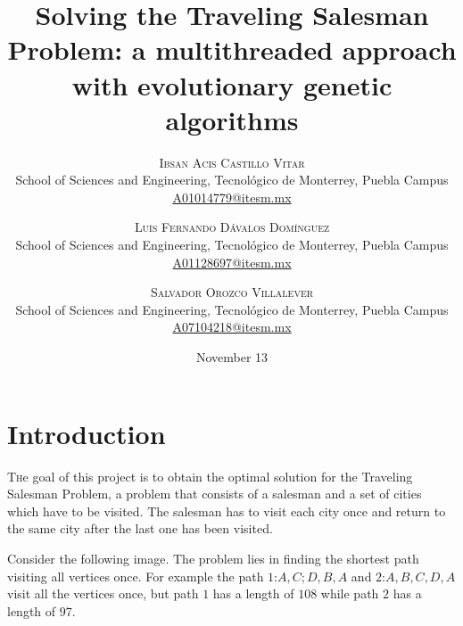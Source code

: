 \documentclass[twoside,twocolumn]{article}
\title{Solving the Traveling Salesman Problem: a multithreaded approach with evolutionary genetic algorithms} %
\author{%
  \textsc{Ibsan Acis Castillo Vitar} \\[1ex] %
  \normalsize School of Sciences and Engineering, Tecnológico de Monterrey, Puebla Campus \\ %
  \normalsize \href{mailto:A01014779@itesm.mx}{A01014779@itesm.mx} %
  \and %
  \textsc{Luis Fernando Dávalos Domínguez} \\[1ex] %
  \normalsize School of Sciences and Engineering, Tecnológico de Monterrey, Puebla Campus \\ %
  \normalsize \href{mailto:A01128697@itesm.mx}{A01128697@itesm.mx} %
  \and %
  \textsc{Salvador Orozco Villalever} \\[1ex] %
  \normalsize School of Sciences and Engineering, Tecnológico de Monterrey, Puebla Campus \\ %
  \normalsize \href{mailto:A07104218@itesm.mx}{A07104218@itesm.mx} %
  }
\date{November 13\nth 2017} %
\begin{document}
  
  \maketitle
  
  
  \section{Introduction}
  
  \lettrine[nindent=0em,lines=3]{T}he goal of this project is to obtain the optimal solution for the Traveling Salesman Problem, a problem that consists of a salesman and a set of cities which have to be visited. The salesman has to visit each city once and return to the same city after the last one has been visited.\linebreak
  
  Consider the following image. The problem lies in finding the shortest path visiting all vertices once. For example the path $1$:${A,C;D,B,A}$ and $2$:${A,B,C,D,A}$ visit all the vertices once, but path $1$ has a length of $108$ while path $2$ has a length of $97$.\linebreak
  
      
\end{document}
